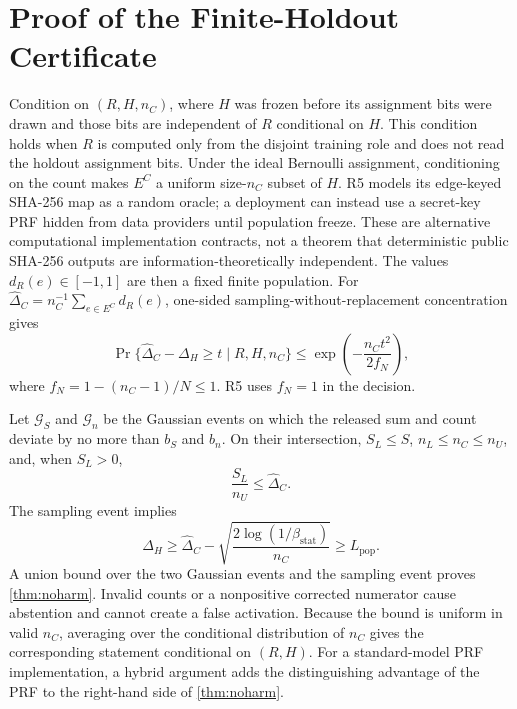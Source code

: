 \section{Proof of the Finite-Holdout Certificate}
\label{app:finite}

Condition on $(R,H,n_C)$, where $H$ was frozen before its assignment bits were
drawn and those bits are independent of $R$ conditional on $H$. This condition
holds when $R$ is computed only from the disjoint training role and does not
read the holdout assignment bits. Under the ideal Bernoulli assignment,
conditioning on the count makes $E^C$ a uniform size-$n_C$ subset of $H$.
R5 models its edge-keyed SHA-256 map as a random oracle; a deployment can
instead use a secret-key PRF hidden from data providers until population
freeze. These are alternative computational implementation contracts, not a
theorem that deterministic public SHA-256 outputs are
information-theoretically independent. The values $d_R(e)\in[-1,1]$ are then
a fixed finite population. For
$\widehat\Delta_C=n_C^{-1}\sum_{e\in E^C}d_R(e)$, one-sided
sampling-without-replacement concentration gives
\begin{equation}
 \Pr\{\widehat\Delta_C-\Delta_H\geq t\mid R,H,n_C\}
 \leq
 \exp\!\left(-\frac{n_Ct^2}{2f_N}\right),
\end{equation}
where $f_N=1-(n_C-1)/N\leq1$. R5 uses $f_N=1$ in the decision.

Let $\mathcal G_S$ and $\mathcal G_n$ be the Gaussian events on which the
released sum and count deviate by no more than $b_S$ and $b_n$. On their
intersection, $S_L\leq S$, $n_L\leq n_C\leq n_U$, and, when $S_L>0$,
\begin{equation}
 \frac{S_L}{n_U}\leq\widehat\Delta_C.
\end{equation}
The sampling event implies
\begin{equation}
 \Delta_H\geq\widehat\Delta_C-
 \sqrt{\frac{2\log(1/\beta_{\mathrm{stat}})}{n_C}}
 \geq L_{\mathrm{pop}}.
\end{equation}
A union bound over the two Gaussian events and the sampling event proves
\cref{thm:noharm}. Invalid counts or a nonpositive corrected numerator cause
abstention and cannot create a false activation.
Because the bound is uniform in valid $n_C$, averaging over the conditional
distribution of $n_C$ gives the corresponding statement conditional on
$(R,H)$.
For a standard-model PRF implementation, a hybrid argument adds the
distinguishing advantage of the PRF to the right-hand side of
\cref{thm:noharm}.

